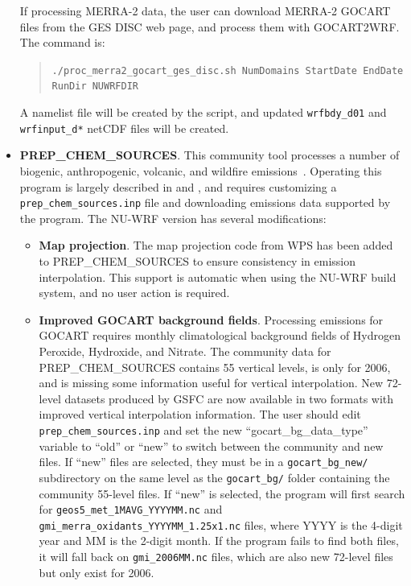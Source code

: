 \begin{itemize}
If processing MERRA-2 data, the user can download MERRA-2 GOCART files from
the GES DISC web page, and process them with GOCART2WRF.  The command is:
\begin{quote}
  \texttt{./proc\_merra2\_gocart\_ges\_disc.sh NumDomains StartDate EndDate RunDir NUWRFDIR}
\end{quote}
A namelist file will be created by the script, and updated 
\texttt{wrfbdy\_d01} and \texttt{wrfinput\_d*} netCDF files will be created.

\item \textbf{PREP\_CHEM\_SOURCES}. This community tool processes a number of
biogenic, anthropogenic, volcanic, and wildfire 
emissions~\citep{ref:FreitasEtAl2011}. Operating this program is largely 
described in \cite{ref:WrfChemEmissionsGuide} and \cite{ref:WrfChemUserGuide},
and requires customizing a \\
\texttt{prep\_chem\_sources.inp} file and downloading emissions data supported
by the program. The NU-WRF version has several modifications:

\begin{itemize}

\item \textbf{Map projection}. The map projection code from WPS has been added
to PREP\_CHEM\_SOURCES to ensure consistency in emission interpolation. This
support is automatic when using the NU-WRF build system, and no user action
is required.

\item \textbf{Improved GOCART background fields}. Processing emissions for
GOCART requires monthly climatological background fields of 
Hydrogen Peroxide, Hydroxide, and Nitrate. The community data for
PREP\_CHEM\_SOURCES contains 55 vertical levels, is only for 2006, and is 
missing some information useful for vertical interpolation. New 72-level
datasets produced by GSFC are now available in two formats with improved 
vertical interpolation information.  The user should edit
\texttt{prep\_chem\_sources.inp} and set the new 
``gocart\_bg\_data\_type'' variable to ``old'' or ``new'' to switch between the
community and new files. If ``new'' files are selected, they must be in a
\texttt{gocart\_bg\_new/} subdirectory on the same level as the 
\texttt{gocart\_bg/} folder containing the community 55-level files. If 
``new'' is selected, the program will first search for 
\texttt{geos5\_met\_1MAVG\_YYYYMM.nc} and 
\texttt{gmi\_merra\_oxidants\_YYYYMM\_1.25x1.nc} files, where YYYY is the 
4-digit year and MM is the 2-digit month. If the program fails to find both 
files, it will fall back on \texttt{gmi\_2006MM.nc} files, which are also new
72-level files but only exist for 2006.


\end{itemize}
\end{itemize}
